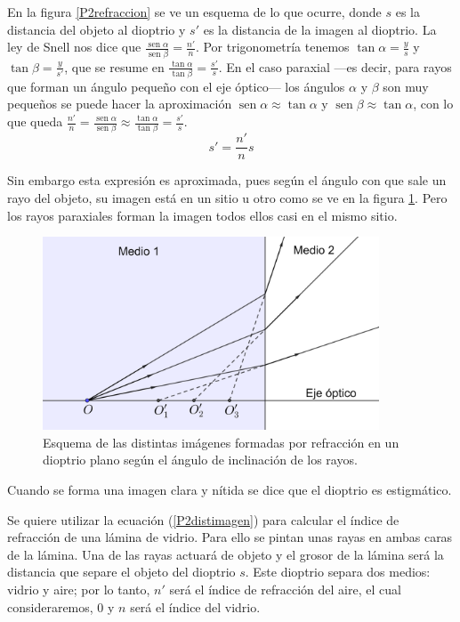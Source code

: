 \documentclass[12pt]{article}
\DeclareMathOperator{\sen}{sen}
\numberwithin{table}{section}
\numberwithin{figure}{section}
\numberwithin{equation}{section}
\begin{document}
En la figura \ref{P2refraccion} se ve un esquema de lo que ocurre, donde $s$ es la distancia del objeto al dioptrio y $s'$ es la distancia de la imagen al dioptrio. La ley de Snell nos dice que $\frac{\sen\alpha}{\sen\beta}=\frac{n'}{n}$. Por trigonometría tenemos $\tan\alpha=\frac{y}{s}$ y $\tan\beta=\frac{y}{s'}$, que se resume en $\frac{\tan\alpha}{\tan\beta}=\frac{s'}{s}$. En el caso paraxial ---es decir, para rayos que forman un ángulo pequeño con el eje óptico--- los ángulos $\alpha$ y $\beta$ son muy pequeños se puede hacer la aproximación $\sen\alpha\approx\tan\alpha$ y $\sen\beta\approx\tan\alpha$, con lo que queda $\frac{n'}{n}=\frac{\sen\alpha}{\sen\beta}\approx\frac{\tan\alpha}{\tan\beta}=\frac{s'}{s}$.
\begin{equation}\label{P2distimagen}
s'=\frac{n'}{n}s
\end{equation} 

Sin embargo esta expresión es aproximada, pues según el ángulo con que sale un rayo del objeto, su imagen está en un sitio u otro como se ve en la figura \ref{P2astigmatismo}. Pero los rayos paraxiales forman la imagen todos ellos casi en el mismo sitio.

\begin{figure}[!ht]
\begin{center}
\includegraphics[width=10cm]{P2Astigmatismo.png}
\caption{Esquema de las distintas imágenes formadas por refracción en un dioptrio plano según el ángulo de inclinación de los rayos.}
\label{P2astigmatismo}
\end{center}
\end{figure}

Cuando se forma una imagen clara y nítida se dice que el dioptrio es estigmático.

Se quiere utilizar la ecuación (\ref{P2distimagen}) para calcular el índice de refracción de una lámina de vidrio. Para ello se pintan unas rayas en ambas caras de la lámina. Una de las rayas actuará de objeto y el grosor de la lámina será la distancia que separe el objeto del dioptrio $s$. Este dioptrio separa dos medios: vidrio y aire; por lo tanto, $n'$ será el índice de refracción del aire, el cual consideraremos, 0 y $n$ será el índice del vidrio.
\end{document}
